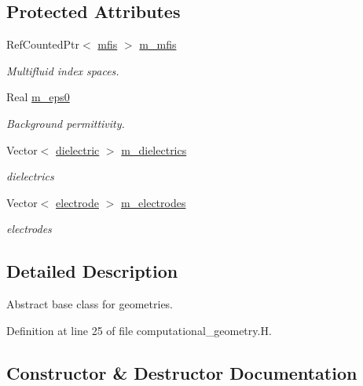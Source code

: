 \subsection*{Protected Attributes}
\begin{DoxyCompactItemize}
\item 
Ref\+Counted\+Ptr$<$ \hyperlink{classmfis}{mfis} $>$ \hyperlink{classcomputational__geometry_a5c1f89c6e4bb2d10a0cf066a76a1928e}{m\+\_\+mfis}
\begin{DoxyCompactList}\small\item\em Multifluid index spaces. \end{DoxyCompactList}\item 
Real \hyperlink{classcomputational__geometry_a4825cf47fffc4aaabfbfd8892df93838}{m\+\_\+eps0}
\begin{DoxyCompactList}\small\item\em Background permittivity. \end{DoxyCompactList}\item 
Vector$<$ \hyperlink{classdielectric}{dielectric} $>$ \hyperlink{classcomputational__geometry_a3a240a90ecd56d276e1a823e9ce0be69}{m\+\_\+dielectrics}
\begin{DoxyCompactList}\small\item\em dielectrics \end{DoxyCompactList}\item 
Vector$<$ \hyperlink{classelectrode}{electrode} $>$ \hyperlink{classcomputational__geometry_a042c15a5ab914e6f278ed93665b02a15}{m\+\_\+electrodes}
\begin{DoxyCompactList}\small\item\em electrodes \end{DoxyCompactList}\end{DoxyCompactItemize}


\subsection{Detailed Description}
Abstract base class for geometries. 

Definition at line 25 of file computational\+\_\+geometry.\+H.



\subsection{Constructor \& Destructor Documentation}
